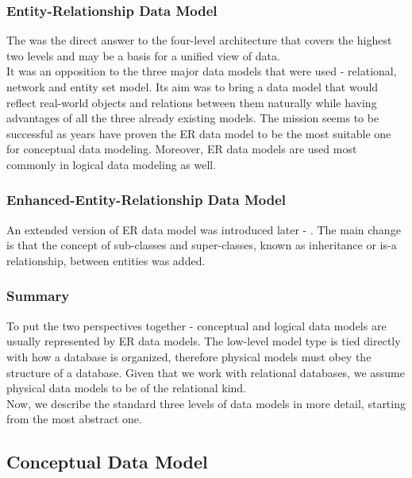 \subsubsection{Entity-Relationship Data Model}

The  was the direct answer to the four-level architecture\cite{Chen76theentity-relationship} that covers the highest two levels and may be a basis for a unified view of data. \\
It was an opposition to the three major data models that were used - relational, network and entity set model. Its aim was to bring a data model that would reflect real-world objects and relations between them naturally while having advantages of all the three already existing models. The mission seems to be successful as years have proven the ER data model to be the most suitable one for conceptual data modeling. Moreover, ER data models are used most commonly in logical data modeling as well.

\subsubsection{Enhanced-Entity-Relationship Data Model}

An extended version of ER data model was introduced later - . The main change is that the concept of sub-classes and super-classes, known as inheritance or is-a relationship, between entities was added. \\ 

\subsubsection{Summary}

To put the two perspectives together - conceptual and logical data models are usually represented by ER data models.
The low-level model type is tied directly with how a database is organized, therefore physical models must obey the structure of a database.
Given that we work with relational databases, we assume physical data models to be of the relational kind. \\

Now, we describe the standard three levels of data models in more detail, starting from the most abstract one.

\subsection{Conceptual Data Model}

